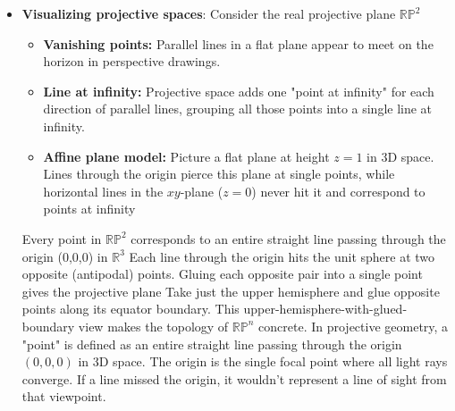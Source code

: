 \documentclass{report}
\begin{document}
\begin{itemize}
            \bigbreak \noindent 
            Two points $P$ and $Q$ are conjugate with respect to a conic section (such as a parabola, ellipse, or hyperbola) if the polar line of point $Q$ passes through point $Q$, which symmetrically means the polar line of point $Q$ passes through point $P$
            \bigbreak \noindent 
            Briefly, if the absolute conic is represented by a 3 $\times$ 3 symmetric matrix $\Omega_{\infty} $, and the directions are the points $d_{1}$ and $d_{2}$, then they are conjugate with respect to $\Omega_{\infty}$ if $d_{1}^{T}\Omega_{\infty}d_{2} = 0$. More generally, angles may be defined in terms of the absolute conic in any arbitrary coordinate system.
        \item \textbf{Visualizing projective spaces}: Consider the real projective plane $\mathbb{RP}^{2}$
            \begin{itemize}
                \item \textbf{Vanishing points:} Parallel lines in a flat plane appear to meet on the horizon in perspective drawings.
                \item \textbf{Line at infinity:} Projective space adds one "point at infinity" for each direction of parallel lines, grouping all those points into a single line at infinity.
                \item \textbf{Affine plane model:} Picture a flat plane at height $z = 1$ in 3D space. Lines through the origin pierce this plane at single points, while horizontal lines in the $xy$-plane ($z = 0$) never hit it and correspond to points at infinity
            \end{itemize}
            Every point in \(\mathbb{RP}^2\) corresponds to an entire straight line passing through the origin (0,0,0) in \(\mathbb{R}^{3}\)
            \bigbreak \noindent 
            Each line through the origin hits the unit sphere at two opposite (antipodal) points. Gluing each opposite pair into a single point gives the projective plane
            \bigbreak \noindent 
            Take just the upper hemisphere and glue opposite points along its equator boundary. This upper-hemisphere-with-glued-boundary view makes the topology of \(\mathbb{RP}^n\) concrete.
            \bigbreak \noindent 
            In projective geometry, a "point" is defined as an entire straight line passing through the origin \((0, 0, 0)\) in 3D space.
            \bigbreak \noindent 
            The origin is the single focal point where all light rays converge. If a line missed the origin, it wouldn't represent a line of sight from that viewpoint.

\end{itemize}
\end{document}
